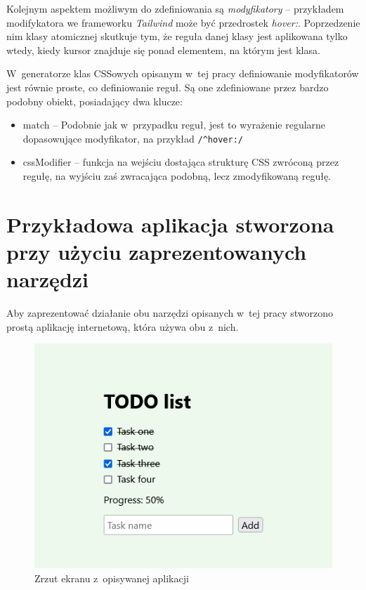 \documentclass{SGGW-thesis}
\begin{document}
Kolejnym aspektem możliwym do zdefiniowania są \emph{modyfikatory} -- przykładem modifykatora we frameworku \emph{Tailwind} może być przedrostek \emph{hover:}. Poprzedzenie nim klasy atomicznej skutkuje tym, że reguła danej klasy jest aplikowana tylko wtedy, kiedy kursor znajduje się ponad elementem, na którym jest klasa.

W~generatorze klas CSSowych opisanym w~tej pracy definiowanie modyfikatorów jest równie proste, co definiowanie reguł. Są one zdefiniowane przez bardzo podobny obiekt, posiadający dwa klucze:
\begin{itemize}
    \item match -- Podobnie jak w~przypadku reguł, jest to wyrażenie regularne dopasowujące modyfikator, na przykład \verb|/^hover:/|
    \item cssModifier -- funkcja na wejściu dostająca strukturę CSS zwróconą przez regułę, na wyjściu zaś zwracająca podobną, lecz zmodyfikowaną regułę.
\end{itemize}


\chapter{Przykładowa aplikacja stworzona przy użyciu zaprezentowanych narzędzi}
Aby zaprezentować działanie obu narzędzi opisanych w~tej pracy stworzono prostą aplikację internetową, która używa obu z~nich.

\begin{figure}[h]
    \centering
    \includegraphics[width=\textwidth]{test-app.png}
    \caption{Zrzut ekranu z~opisywanej aplikacji}
\end{figure}
\end{document}
